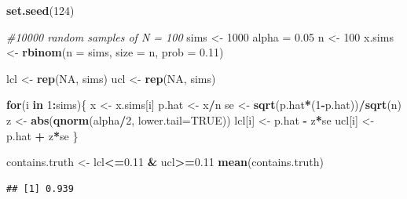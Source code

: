 \documentclass[
]{book}
\newenvironment{Shaded}{\begin{snugshade}}{\end{snugshade}}
\newcommand{\AttributeTok}[1]{\textcolor[rgb]{0.13,0.29,0.53}{#1}}
\newcommand{\CommentTok}[1]{\textcolor[rgb]{0.56,0.35,0.01}{\textit{#1}}}
\newcommand{\ConstantTok}[1]{\textcolor[rgb]{0.56,0.35,0.01}{#1}}
\newcommand{\ControlFlowTok}[1]{\textcolor[rgb]{0.13,0.29,0.53}{\textbf{#1}}}
\newcommand{\DecValTok}[1]{\textcolor[rgb]{0.00,0.00,0.81}{#1}}
\newcommand{\FloatTok}[1]{\textcolor[rgb]{0.00,0.00,0.81}{#1}}
\newcommand{\FunctionTok}[1]{\textcolor[rgb]{0.13,0.29,0.53}{\textbf{#1}}}
\newcommand{\NormalTok}[1]{#1}
\newcommand{\OtherTok}[1]{\textcolor[rgb]{0.56,0.35,0.01}{#1}}
\newcommand{\SpecialCharTok}[1]{\textcolor[rgb]{0.81,0.36,0.00}{\textbf{#1}}}
\begin{document}
\begin{Shaded}
\begin{Highlighting}[]
\FunctionTok{set.seed}\NormalTok{(}\DecValTok{124}\NormalTok{)}

\CommentTok{\#10000 random samples of N = 100}
\NormalTok{sims }\OtherTok{\textless{}{-}} \DecValTok{1000}
\NormalTok{alpha }\OtherTok{=} \FloatTok{0.05}
\NormalTok{n }\OtherTok{\textless{}{-}} \DecValTok{100}
\NormalTok{x.sims }\OtherTok{\textless{}{-}} \FunctionTok{rbinom}\NormalTok{(}\AttributeTok{n =}\NormalTok{ sims, }\AttributeTok{size =}\NormalTok{ n, }\AttributeTok{prob =} \FloatTok{0.11}\NormalTok{)}

\NormalTok{lcl }\OtherTok{\textless{}{-}} \FunctionTok{rep}\NormalTok{(}\ConstantTok{NA}\NormalTok{, sims)}
\NormalTok{ucl }\OtherTok{\textless{}{-}} \FunctionTok{rep}\NormalTok{(}\ConstantTok{NA}\NormalTok{, sims)}

\ControlFlowTok{for}\NormalTok{(i }\ControlFlowTok{in} \DecValTok{1}\SpecialCharTok{:}\NormalTok{sims)\{}
\NormalTok{  x }\OtherTok{\textless{}{-}}\NormalTok{ x.sims[i]}
\NormalTok{  p.hat }\OtherTok{\textless{}{-}}\NormalTok{ x}\SpecialCharTok{/}\NormalTok{n}
\NormalTok{  se }\OtherTok{\textless{}{-}} \FunctionTok{sqrt}\NormalTok{(p.hat}\SpecialCharTok{*}\NormalTok{(}\DecValTok{1}\SpecialCharTok{{-}}\NormalTok{p.hat))}\SpecialCharTok{/}\FunctionTok{sqrt}\NormalTok{(n)}
\NormalTok{  z }\OtherTok{\textless{}{-}} \FunctionTok{abs}\NormalTok{(}\FunctionTok{qnorm}\NormalTok{(alpha}\SpecialCharTok{/}\DecValTok{2}\NormalTok{, }\AttributeTok{lower.tail=}\ConstantTok{TRUE}\NormalTok{))}
\NormalTok{  lcl[i] }\OtherTok{\textless{}{-}}\NormalTok{ p.hat }\SpecialCharTok{{-}}\NormalTok{ z}\SpecialCharTok{*}\NormalTok{se}
\NormalTok{  ucl[i] }\OtherTok{\textless{}{-}}\NormalTok{ p.hat }\SpecialCharTok{+}\NormalTok{ z}\SpecialCharTok{*}\NormalTok{se}
\NormalTok{\}}

\NormalTok{contains.truth }\OtherTok{\textless{}{-}}\NormalTok{ lcl}\SpecialCharTok{\textless{}=}\FloatTok{0.11} \SpecialCharTok{\&}\NormalTok{ ucl}\SpecialCharTok{\textgreater{}=}\FloatTok{0.11}
\FunctionTok{mean}\NormalTok{(contains.truth)}
\end{Highlighting}
\end{Shaded}

\begin{verbatim}
## [1] 0.939
\end{verbatim}
\end{document}
